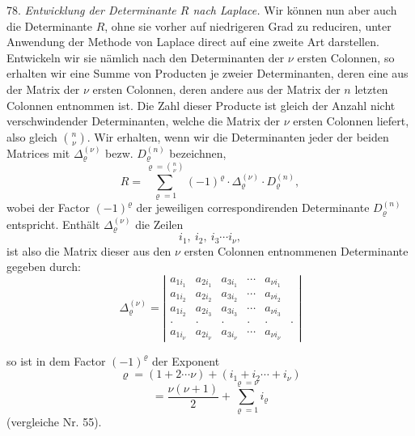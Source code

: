 78. \textit{Entwicklung der Determinante $R$ nach Laplace.} Wir k\"onnen
nun aber auch die Determinante $R$, ohne sie vorher auf niedrigeren Grad zu
reduciren, unter Anwendung der Methode von Laplace direct auf eine zweite
Art darstellen. Entwickeln wir sie n\"amlich nach den Determinanten der $\nu$
ersten Colonnen, so erhalten wir eine Summe von Producten je zweier
Determinanten, deren eine aus der Matrix der $\nu$ ersten Colonnen, deren
andere aus der Matrix der $n$ letzten Colonnen entnommen ist. Die Zahl
dieser Producte ist gleich der Anzahl nicht verschwindender Determinanten,
welche die Matrix der $\nu$ ersten Colonnen liefert, also gleich
$\binom{n}{\nu}$. Wir erhalten, wenn wir die Determinanten jeder der
beiden Matrices mit $\varDelta_\varrho^{(\nu)}$ bezw. $D_\varrho^{(n)}$ bezeichnen,
\[
R=\sum_{\varrho=1}^{\varrho=\binom{n}{\nu}}(-1)^\varrho\cdot\varDelta_\varrho^{(\nu)}\cdot D_\varrho^{(n)}, \tag{A}
\]
wobei der Factor $(-1)^\varrho$ der jeweiligen correspondirenden Determinante
$D_\varrho^{(n)}$ entspricht. Enth\"alt $\varDelta_\varrho^{(\nu)}$ die Zeilen
\[
i_1,\ i_2,\ i_3\cdots i_\nu,
\]
ist also die Matrix dieser aus den $\nu$ ersten Colonnen entnommenen
Determinante gegeben durch:
\[
\varDelta_\varrho^{(\nu)}=
\left|\begin{array}{cccccc}
a_{1i_1} & a_{2i_1} & a_{3i_1} & \cdots & a_{\nu i_1}\\
a_{1i_2} & a_{2i_2} & a_{3i_2} & \cdots & a_{\nu i_2}\\
a_{1i_2} & a_{2i_3} & a_{3i_3} & \cdots & a_{\nu i_3}\\
\cdot & \cdot & \cdot & \cdot & \cdot & \cdot\\
a_{1i_\nu} & a_{2i_\nu} & a_{3i_\nu} & \cdots & a_{\nu i_\nu}
\end{array}\right| \tag{B}
\]



so ist in dem Factor $(-1)^\varrho$ der Exponent
\[
\varrho=(1+2\cdots\nu)+(i_1+i_2\cdots+i_\nu)
\]
\[
=\frac{\nu(\nu+1)}{2}+\sum_{\varrho=1}^{\varrho=\nu}i_\varrho \tag{C}
\]
(vergleiche Nr. 55).

